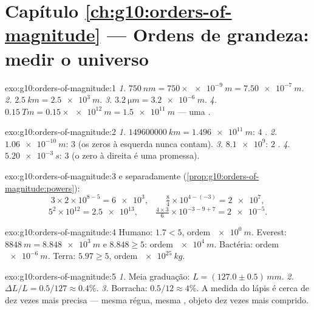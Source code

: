 \section*{Capítulo \ref{ch:g10:orders-of-magnitude} --- Ordens de grandeza: medir o universo}

\begin{solution}{exo:g10:orders-of-magnitude:1}
\emph{1.} $\qty{750}{nm} = 750 \times \qty{e-9}{m} = \qty{7.50e-7}{m}$.
\emph{2.} $\qty{2.5}{km} = \qty{2.5e3}{m}$.
\emph{3.} $\qty{3.2}{\micro m} = \qty{3.2e-6}{m}$.
\emph{4.} $\qty{0.15}{Tm} = 0.15 \times \qty{e12}{m} = \qty{1.5e11}{m}$
--- uma .
\end{solution}

\begin{solution}{exo:g10:orders-of-magnitude:2}
\emph{1.} $\qty{149600000}{km} = \qty{1.496e11}{m}$: $4$ .
\emph{2.} $\qty{1.06e-10}{m}$: $3$  (os zeros à
esquerda nunca contam).
\emph{3.} $\num{8.1e9}$: $2$ .
\emph{4.} $\qty{5.20e-3}{s}$: $3$  (o zero à
direita é uma promessa).
\end{solution}

\begin{solution}{exo:g10:orders-of-magnitude:3}
 e  separadamente
(\cref{prop:g10:orders-of-magnitude:powers}):
\[
3 \times 2 \times 10^{8-5} = \num{6e3}, \qquad
\tfrac{8}{4} \times 10^{4-(-3)} = \num{2e7},
\]
\[
5^{2} \times 10^{12} = \num{2.5e13}, \qquad
\tfrac{4 \times 3}{6} \times 10^{-3-9+7} = \num{2e-5} .
\]
\end{solution}

\begin{solution}{exo:g10:orders-of-magnitude:4}
Humano: $1.7 < 5$, ordem $\qty{e0}{m}$. Everest:
$\qty{8848}{m} = \qty{8.848e3}{m}$ e $8.848 \geq 5$: ordem
$\qty{e4}{m}$. Bactéria: ordem $\qty{e-6}{m}$. Terra: $5.97 \geq 5$,
ordem $\qty{e25}{kg}$.
\end{solution}

\begin{solution}{exo:g10:orders-of-magnitude:5}
\emph{1.} Meia graduação: $L = (127.0 \pm 0.5)\,\unit{mm}$.
\emph{2.} $\Delta L / L = 0.5/127 \approx 0.4\%$.
\emph{3.} Borracha: $0.5/12 \approx 4\%$. A medida do lápis é cerca de
dez vezes mais precisa --- mesma régua, mesma , objeto
dez vezes mais comprido.
\end{solution}

